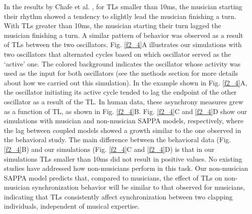 \documentclass{report}
\begin{document}
In the results by Chafe et al. \cite{chafe2010effect}, for TLs smaller than 10ms, the musician starting their rhythm showed a tendency to slightly lead the musician finishing a turn. With TLs greater than 10ms, the musician starting their turn lagged the musician finishing a turn. A similar pattern of behavior was observed as a result of TLs between the two oscillators. Fig.{} \ref{f2_4}A illustrates our simulations with two oscillators that alternated cycles based on which oscillator served as the `active' one. The colored background indicates the oscillator whose activity was used as the input for both oscillators (see the methods section for more details about how we carried out this simulation). In the example shown in Fig.{} \ref{f2_4}A, the oscillator initiating its active cycle tended to lag the endpoint of the other oscillator as a result of the TL. In human data, these asynchrony measures grew as a function of TL, as shown in Fig.{} \ref{f2_4}B. Fig.{} \ref{f2_4}C and \ref{f2_4}D show our simulations with musician and non-musician SAPPA models, respectively, where the lag between coupled models showed a growth similar to the one observed in the behavioral study. The main difference between the behavioral data (Fig.{} \ref{f2_4}B) and our simulations (Fig.{} \ref{f2_4}C and \ref{f2_4}D) is that in our simulations TLs smaller than 10ms did not result in positive values. No existing studies have addressed how non-musicians perform in this task. Our non-musician SAPPA model predicts that, compared to musicians, the effect of TLs on non-musician synchronization behavior will be similar to that observed for musicians, indicating that TLs consistently affect synchronization between two clapping individuals, independent of musical expertise.
\end{document}
